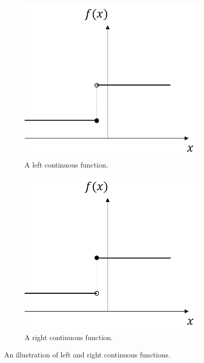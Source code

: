 \begin{refsection}
\begin{figure}[H]
	\centering
	\begin{subfigure}[b]{0.4\textwidth}
		\includegraphics[width=\textwidth]{figures/mathFundamentals/LeftContinuousFunctionDemo}
		\caption{A left continuous function.}
	\end{subfigure}\quad
	\begin{subfigure}[b]{0.4\textwidth}
		\includegraphics[width=\textwidth]{figures/mathFundamentals/RightContinuousFunctionDemo}
		\caption{A right continuous function.}
	\end{subfigure}
	\caption{An illustration of left and right continuous functions.}
\end{figure}


\end{refsection}
